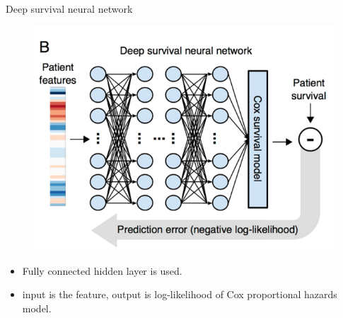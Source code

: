 \documentclass[
]{beamer}
\begin{document}
	
	\begin{frame}[plain]{Deep survival neural network}
		\begin{figure}
			\centering
			\includegraphics[scale=0.4]{nn1}
		\end{figure}
		\begin{itemize}
			\item Fully connected hidden layer is used. 
			\item input is the feature, output is log-likelihood of Cox proportional hazards model.
		\end{itemize}
	\end{frame}
	
\end{document}
